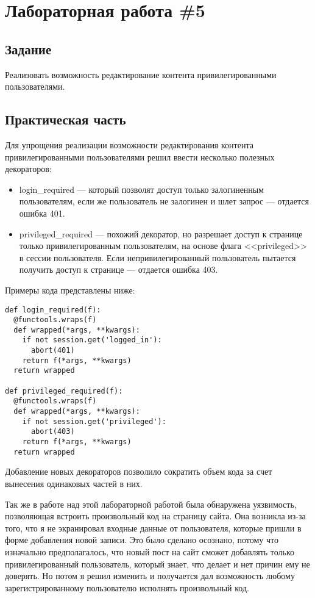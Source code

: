 \documentclass[14pt, a4paper]{extreport}
\begin{document}
\section*{Лабораторная работа \#5}
\subsection*{Задание}
Реализовать возможность редактирование контента привилегированными пользователями.
\subsection*{Практическая часть}
Для упрощения реализации возможности редактирования контента привилегированными пользователями
решил ввести несколько полезных декораторов:
\begin{itemize}
\item login\_required --- который позволят доступ только залогиненным пользователям, если же
  пользователь не залогинен и шлет запрос --- отдается ошибка 401.
\item privileged\_required --- похожий декоратор, но разрешает доступ к странице только
  привилегированным пользователям, на основе флага <<privileged>> в сессии пользователя.
  Если непривилегированный пользователь пытается получить доступ к странице --- отдается
  ошибка 403.
\end{itemize}

Примеры кода представлены ниже:

\begin{lstlisting}
def login_required(f):
  @functools.wraps(f)
  def wrapped(*args, **kwargs):
    if not session.get('logged_in'):
      abort(401)
    return f(*args, **kwargs)
  return wrapped

def privileged_required(f):
  @functools.wraps(f)
  def wrapped(*args, **kwargs):
    if not session.get('privileged'):
      abort(403)
    return f(*args, **kwargs)
  return wrapped
\end{lstlisting}

Добавление новых декораторов позволило сократить объем кода за счет вынесения одинаковых
частей в них.

Так же в работе над этой лабораторной работой была обнаружена уязвимость, позволяющая
встроить произвольный код на страницу сайта. Она возникла из-за того, что я не экранировал
входные данные от пользователя, которые пришли в форме добавления новой записи.
Это было сделано осознано, потому что изначально предполагалось, что новый пост на
сайт сможет добавлять только привилегированный пользователь, который знает, что делает
и нет причин ему не доверять. Но потом я решил изменить и получается дал возможность любому
зарегистрированному пользователю исполнять произвольный код.
\end{document}
